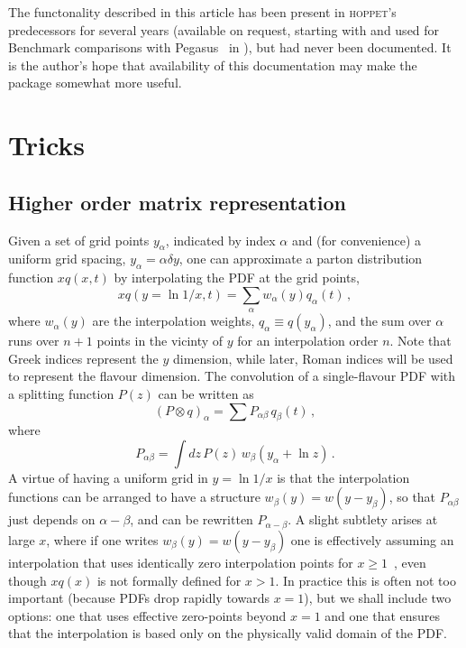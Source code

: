 \documentclass[12pt]{article}
\newcommand{\hoppet}{\textsc{hoppet}\xspace}
\begin{document}
The functonality described in this article has been present in
\hoppet's predecessors for several years (available on request,
starting with \cite{DisResum} and used for Benchmark comparisons with
Pegasus~\cite{Pegasus} in \cite{Benchmarks}), but had never been
documented.  It is the author's hope that availability of this
documentation may make the package somewhat more useful.


\section{Tricks}
\label{tricks}

\subsection{Higher order matrix representation}
\label{sec:highord}


Given a set of grid points $y_\alpha$, indicated by index $\alpha$ and
(for convenience) a uniform grid spacing, $y_\alpha = \alpha \delta
y$, one can approximate a parton distribution function $xq(x,t)$ by
interpolating the PDF at the grid points,
\begin{equation}
  x q(y=\ln 1/x,t) = \sum_\alpha w_\alpha(y) q_\alpha(t)\,,
\end{equation}
where $w_\alpha(y)$ are the interpolation weights, $q_\alpha \equiv
q(y_\alpha)$, and the sum over $\alpha$ runs over $n+1$ points in the
vicinty of $y$ for an interpolation order $n$. Note that Greek
indices represent the $y$ dimension, while later, Roman indices will
be used to represent the flavour dimension.
%
The convolution of a single-flavour PDF with a splitting function
$P(z)$ can be written as
\begin{equation}
  (P \otimes q)_\alpha = \sum P_{\alpha\beta} \, q_\beta(t)\,,
\end{equation}
where 
\begin{equation}
  \label{eq:Palphabeta}
  P_{\alpha\beta} = \int dz \,P(z)\, w_\beta(y_\alpha + \ln z)\,.
\end{equation}
A virtue of having a uniform grid in $y = \ln 1/x$ is that the
interpolation functions can be arranged to have a structure
$w_\beta(y) = w(y - y_\beta)$, so that $P_{\alpha\beta}$ just depends
on $\alpha - \beta$, and can be rewritten $P_{\alpha - \beta}$. A
slight subtlety arises at large $x$, where if one writes $w_\beta(y) =
w(y - y_\beta)$ one is effectively assuming an interpolation that uses
identically zero interpolation points for $x\ge 1$~\cite{coriano},
even though $xq(x)$ is not formally defined for $x > 1$. In practice
this is often not too important (because PDFs drop rapidly towards
$x=1$), but we shall include two options: one that uses effective
zero-points beyond $x=1$ and one that ensures that the interpolation
is based only on the physically valid domain of the PDF.
\end{document}

